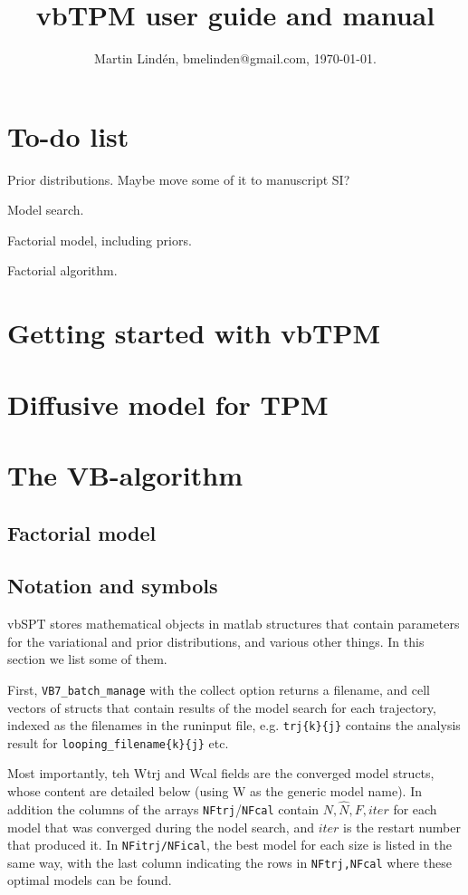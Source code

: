 \documentclass[11pt,letterpaper,twocolumn]{article}
\title{vbTPM user guide and manual}
\author{Martin Lind\'en, bmelinden@gmail.com, \today.}
\date{}
\begin{document}
\maketitle
\tableofcontents
\section*{To-do list}
Prior distributions. Maybe move some of it to manuscript SI?

Model search.

Factorial model, including priors.

Factorial algorithm.


\section{Getting started with vbTPM}

\section{Diffusive model for TPM}

\section{The VB-algorithm}

\subsection{Factorial model}
\subsection{Notation and symbols}\label{sec:notation}
vbSPT stores mathematical objects in matlab structures that contain
parameters for the variational and prior distributions, and various
other things. In this section we list some of them.

First, \verb+VB7_batch_manage+ with the collect option returns a
filename, and cell vectors of structs that contain results of the
model search for each trajectory, indexed as the filenames in the
runinput file, e.g. \verb+trj{k}{j}+ contains the analysis result for
\verb+looping_filename{k}{j}+ etc. 

Most importantly, teh Wtrj and Wcal fields are the converged model
structs, whose content are detailed below (using W as the generic
model name). In addition the columns of the arrays
\verb+NFtrj+/\verb+NFcal+ contain $N,\hat N, F, iter$ for each model
that was converged during the nodel search, and $iter$ is the restart
number that produced it. In \verb+NFitrj/NFical+, the best model for
each size is listed in the same way, with the last column indicating
the rows in \verb+NFtrj,NFcal+ where these optimal models can be
found. 
\end{document}
